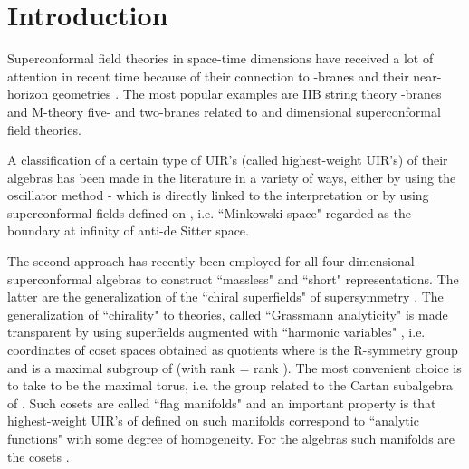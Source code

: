 \documentclass[a4paper,12pt]{article}
\begin{document}
\section{Introduction}



Superconformal field theories in space-time dimensions \coordHE{} 
have received a lot of attention in recent time because of their 
connection to \coordHE{}-branes and their near-horizon \coordHE{} 
geometries \cite{AGMOO}. The most popular examples are IIB string 
theory \coordHE{}-branes and M-theory five- and two-branes related to 
\coordHE{} and \coordHE{} dimensional superconformal field theories. 



A classification of a certain type of UIR's (called highest-weight 
UIR's) of their algebras has been made in the literature in a 
variety of ways, either by using the oscillator method 
\cite{gm}-\cite{GNW} which is directly linked to the \coordHE{} 
interpretation or by using superconformal fields defined on 
\coordHE{}, i.e. ``Minkowski space" 
regarded as the boundary at infinity of anti-de Sitter space. 



The second approach has recently been employed \cite{AFSZ,FS} for 
all four-dimensional superconformal algebras \coordHE{} to 
construct ``massless" and ``short" representations. The latter are 
the generalization of the ``chiral superfields" of \coordHE{} 
supersymmetry \cite{fwz}. The generalization of ``chirality" to 
\coordHE{} theories, called ``Grassmann analyticity" \cite{GIO} is made 
transparent by using superfields augmented with ``harmonic 
variables" \cite{GIKOS,hh}, i.e. coordinates of coset spaces 
obtained as quotients \coordHE{} where \coordHE{} is the R-symmetry group and 
\coordHE{} is a maximal subgroup of \coordHE{} (with rank \coordHE{} = rank \coordHE{}). The 
most convenient choice is to take \coordHE{} to be the maximal torus, 
i.e. the group related to the Cartan subalgebra 
\coordHE{} of \coordHE{}. Such cosets are 
called ``flag manifolds" \cite{Knapp,hh} and an important property 
is that highest-weight UIR's of \coordHE{} defined on such manifolds 
correspond to ``analytic functions" with some degree of 
homogeneity. For the algebras \coordHE{} such manifolds are the 
cosets \coordHE{}. 
\end{document}
